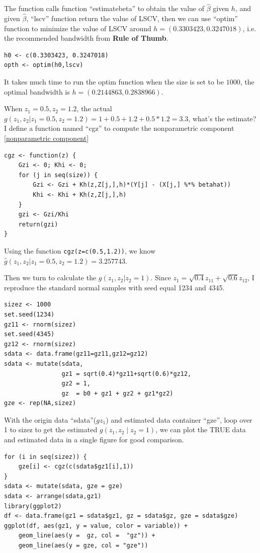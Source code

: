 \documentclass{article}
\begin{document}
The function calls function ``estimatebeta'' to obtain the value of $\hat{\beta}$ given $h$, and given $\hat{\beta}$, ``lscv'' function return the value of LSCV, then we can use ``optim'' function to minimize the value of LSCV around $h=(0.3303423, 0.3247018)$, i.e. the recommended bandwidth from \textbf{Rule of Thumb}.
\begin{lstlisting}
h0 <- c(0.3303423, 0.3247018)
opth <- optim(h0,lscv)
\end{lstlisting}

It takes much time to run the optim function when the size is set to be $1000$, the optimal bandwidth is $h=(0.2144863,0.2838966)$.

When $z_{1}=0.5,z_{2}=1.2$, the actual $g(z_{1},z_{2}|z_{1}=0.5,z_{2}=1.2) = 1+0.5+1.2+0.5*1.2=3.3$, what\rq{}s the estimate? I define a function named ``cgz'' to compute the nonparametric component \eqref{nonparametric component}
\begin{lstlisting}
cgz <- function(z) {
    Gzi <- 0; Khi <- 0;
    for (j in seq(size)) {
        Gzi <- Gzi + Kh(z,Z[j,],h)*(Y[j] - (X[j,] %*% betahat))
        Khi <- Khi + Kh(z,Z[j,],h)
    }
    gzi <- Gzi/Khi
    return(gzi)
}
\end{lstlisting}

Using the function \lstinline|cgz(z=c(0.5,1.2))|, we know $\hat{g}(z_{1},z_{2}| z_{1}=0.5,z_{2}=1.2)=3.257743$.

Then we turn to calculate the $g(z_{1},z_{2} | z_{2}=1)$. Since $z_{1}=\sqrt{0.4}z_{11}+\sqrt{0.6}z_{12}$, I reproduce the standard normal samples with seed equal 1234 and 4345.
\begin{lstlisting}
sizez <- 1000
set.seed(1234)
gz11 <- rnorm(sizez)
set.seed(4345)
gz12 <- rnorm(sizez)
sdata <- data.frame(gz11=gz11,gz12=gz12)
sdata <- mutate(sdata,
                gz1 = sqrt(0.4)*gz11+sqrt(0.6)*gz12,
                gz2 = 1,
                gz  = b0 + gz1 + gz2 + gz1*gz2)
gze <- rep(NA,sizez)
\end{lstlisting}

With the origin data ``sdata''($gz_{1}$) and estimated data container ``gze'', loop over 1 to sizez to get the estimated $g(z_{1},z_{2}\mid z_{2}=1)$, we can plot the TRUE data and estimated data in a single figure for good comparison.
\begin{lstlisting}
for (i in seq(sizez)) {
    gze[i] <- cgz(c(sdata$gz1[i],1))
}
sdata <- mutate(sdata, gze = gze)
sdata <- arrange(sdata,gz1)
library(ggplot2)
df <- data.frame(gz1 = sdata$gz1, gz = sdata$gz, gze = sdata$gze)
ggplot(df, aes(gz1, y = value, color = variable)) +
    geom_line(aes(y =  gz, col =  "gz")) +
    geom_line(aes(y = gze, col = "gze"))
\end{lstlisting}
\end{document}

